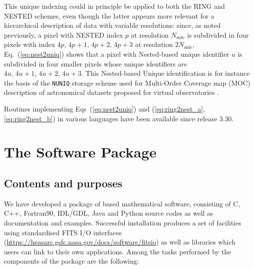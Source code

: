 \documentclass[12pt,twoside]{article}
\newcommand{\nside}{N_{\mathrm{side}}}
\begin{document}
This unique indexing could in principle be applied to both the RING and NESTED schemes, 
even though the latter appears more relevant for a hierarchical description 
of data with variable resolutions: since, as noted previously, a pixel with NESTED index $p$ 
at resolution $\nside$ is subdivided in four pixels with index $4p,\, 4p+1,\, 4p+2,\, 4p+3$ 
at resolution $2\nside$, Eq.~(\ref{eq:nest2uniq}) shows that
a pixel with Nested-based unique identifier $u$ is subdivided in four smaller pixels 
whose unique identifiers are $4u,\, 4u+1,\, 4u+2,\, 4u+3$.
This Nested-based Unique identification is for instance the basis of the \texttt{NUNIQ} storage scheme used for Multi-Order Coverage map (MOC) description of astronomical datasets proposed for virtual observatories \citep{moc}.

Routines implementing Eqs~(\ref{eq:nest2uniq}) and (\ref{eq:ring2nest_a}, \ref{eq:ring2nest_b}) in various languages have been available since release 3.30.


\section{The \healpix Software Package}
\subsection{Contents and purposes}
We have developed a package of \healpix based mathematical software, consisting
of C, C++, Fortran90, IDL/GDL, Java and Python source codes as well as documentation and
examples. Successful installation produces a set of facilities using standardised
FITS I/O interfaces 
(\url{https://heasarc.gsfc.nasa.gov/docs/software/fitsio}) 
as well as 
libraries  which users can link to their own applications.
Among the tasks performed by the  components of the 
\healpix package  are the
following:
\end{document}
